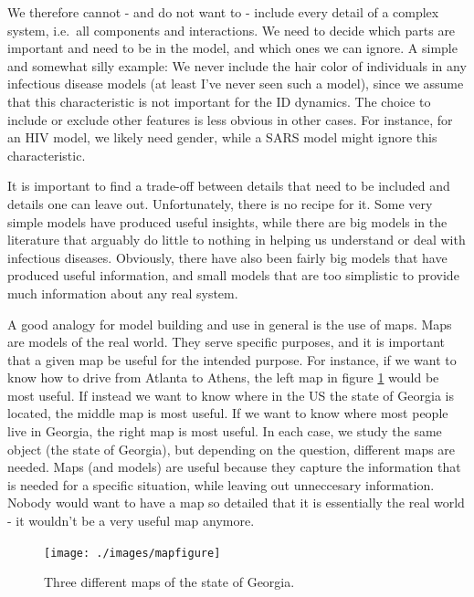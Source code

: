 \documentclass[
]{book}
\begin{document}
We therefore cannot - and do not want to - include every detail of a complex system, i.e.~all components and interactions. We need to decide which parts are important and need to be in the model, and which ones we can ignore. A simple and somewhat silly example: We never include the hair color of individuals in any infectious disease models (at least I've never seen such a model), since we assume that this characteristic is not important for the ID dynamics. The choice to include or exclude other features is less obvious in other cases. For instance, for an HIV model, we likely need gender, while a SARS model might ignore this characteristic.

It is important to find a trade-off between details that need to be included and details one can leave out. Unfortunately, there is no recipe for it. Some very simple models have produced useful insights, while there are big models in the literature that arguably do little to nothing in helping us understand or deal with infectious diseases. Obviously, there have also been fairly big models that have produced useful information, and small models that are too simplistic to provide much information about any real system.

A good analogy for model building and use in general is the use of maps. Maps are models of the real world. They serve specific purposes, and it is important that a given map be useful for the intended purpose. For instance, if we want to know how to drive from Atlanta to Athens, the left map in figure \ref{fig:mapfigure} would be most useful. If instead we want to know where in the US the state of Georgia is located, the middle map is most useful. If we want to know where most people live in Georgia, the right map is most useful. In each case, we study the same object (the state of Georgia), but depending on the question, different maps are needed. Maps (and models) are useful because they capture the information that is needed for a specific situation, while leaving out unneccesary information. Nobody would want to have a map so detailed that it is essentially the real world - it wouldn't be a very useful map anymore.

\begin{figure}
\texttt{[image: ./images/mapfigure]} \caption{Three different maps of the state of Georgia.}\label{fig:mapfigure}
\end{figure}
\end{document}
